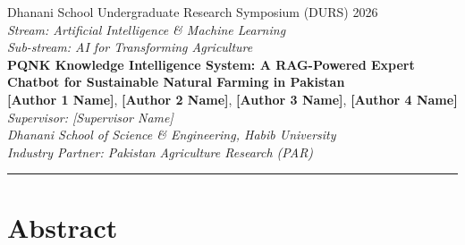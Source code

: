 \documentclass[12pt, a4paper]{article}
\begin{document}
\begin{center}
    {\small Dhanani School Undergraduate Research Symposium (DURS) 2026}\\[4pt]
    {\small \textit{Stream: Artificial Intelligence \& Machine Learning}}\\[4pt]
    {\small \textit{Sub-stream: AI for Transforming Agriculture}}\\[18pt]

    {\LARGE \bfseries PQNK Knowledge Intelligence System: A RAG-Powered Expert\\[4pt]
    Chatbot for Sustainable Natural Farming in Pakistan}\\[14pt]

    {\normalsize
        \textbf{[Author 1 Name]}, \textbf{[Author 2 Name]}, \textbf{[Author 3 Name]}, \textbf{[Author 4 Name]}\\[4pt]
        \textit{Supervisor: [Supervisor Name]}\\[4pt]
        \textit{Dhanani School of Science \& Engineering, Habib University}\\[4pt]
        \textit{Industry Partner: Pakistan Agriculture Research (PAR)}\\[4pt]
    }
\end{center}

\vspace{6pt}
\hrule
\vspace{14pt}

\section*{Abstract}
\end{document}
